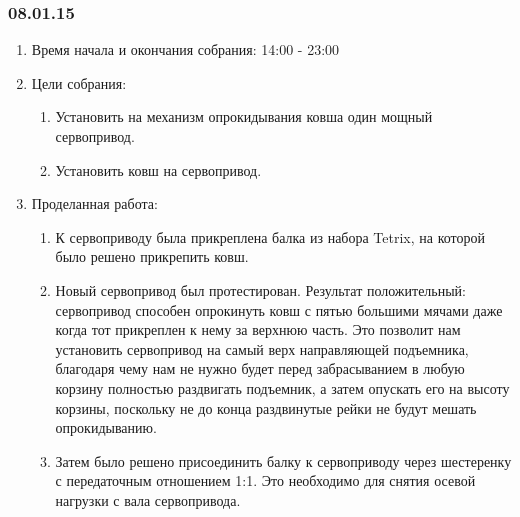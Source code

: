 \subsubsection{08.01.15}

\begin{enumerate}
	\item Время начала и окончания собрания: 14:00 - 23:00
	
	\item Цели собрания: 
	\begin{enumerate}
		
	  \item Установить на механизм опрокидывания ковша один мощный сервопривод.
		
	  \item Установить ковш на сервопривод.
		
	\end{enumerate}
	
	\item Проделанная работа:
	\begin{enumerate}
		
	  \item К сервоприводу была прикреплена балка из набора Tetrix, на которой было решено прикрепить ковш.
		
	  \item Новый сервопривод был протестирован. Результат положительный: сервопривод способен опрокинуть ковш с пятью большими мячами даже когда тот прикреплен к нему за верхнюю часть. Это позволит нам установить сервопривод на самый верх направляющей подъемника, благодаря чему нам не нужно будет перед забрасыванием в любую корзину полностью раздвигать подъемник, а затем опускать его на высоту корзины, поскольку не до конца раздвинутые рейки не будут мешать опрокидыванию.
		
      
      \item Затем было решено присоединить балку к сервоприводу через шестеренку с передаточным отношением 1:1. Это необходимо для снятия осевой нагрузки с вала сервопривода.
      

\end{enumerate}
\end{enumerate}
